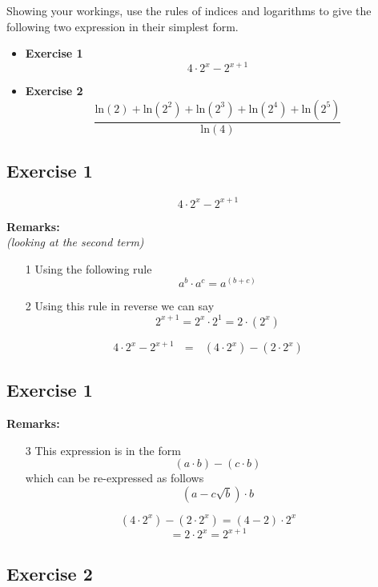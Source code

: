 \documentclass[]{report}
\begin{document}
Showing your workings, use the rules of indices and logarithms to give the following two expression in their simplest form.
\bigskip
\begin{itemize}
\item \textbf{Exercise 1}
\[ 4 \cdot 2^x - 2^{x+1} \]
\item \textbf{Exercise 2}
\[  \frac{\mbox{ln}(2) + \mbox{ln}(2^2) + \mbox{ln}(2^3)  + \mbox{ln}(2^4) + \mbox{ln}(2^5)  }  {\mbox{ln}(4)}  \]
\end{itemize}

\subsection{Exercise 1}

\[ 4 \cdot 2^x - 2^{x+1} \]

\textbf{Remarks:}\\
\textit{(looking at the second term)}
\begin{itemize}
\item[1] Using the following rule
\[ a^b \cdot a^c = a^{(b+c)}  \] 
\item[2] Using this rule in reverse we can say
\[ 2^{x+1} = 2^x \cdot 2^1  = 2\cdot (2^x) \] 
\end{itemize}
\[ 4 \cdot 2^x - 2^{x+1} \mbox{   } = \mbox{   } (4 \cdot 2^x) -  (2\cdot 2^{x}) \]

\subsection{Exercise 1}


\textbf{Remarks:}
\begin{itemize}
\item[3] This expression is in the form 
\[ (a  \cdot b ) - ( c  \cdot b) \]
which can be re-expressed as follows 
\[ (a - c\sqrt{b} )  \cdot b \]
\end{itemize}
\[ (4 \cdot 2^x) -  (2\cdot 2^{x}) = (4-2)  \cdot 2^{x} \]
\[   = 2 \cdot 2^x = 2^{x+1}\]

\subsection{Exercise 2}
\end{document}
